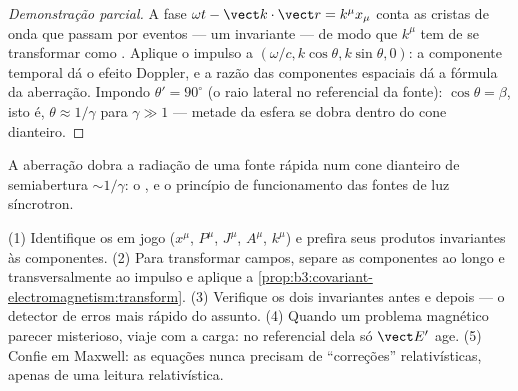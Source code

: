 \begin{proof}[Demonstração parcial]
A fase $\omega t - \vect k\cdot\vect r = k^\mu x_\mu$ conta as cristas
de onda que passam por eventos --- um invariante --- de modo que
$k^\mu$ tem de se transformar como . Aplique o impulso a
$(\omega/c, k\cos\theta,
k\sin\theta, 0)$: a componente temporal dá o efeito Doppler, e a razão
das componentes espaciais dá a fórmula da aberração. Impondo $\theta' =
90^\circ$ (o raio lateral no referencial da fonte):
$\cos\theta =
\beta$, isto é, $\theta \approx 1/\gamma$ para $\gamma \gg 1$ ---
metade da esfera se dobra dentro do cone dianteiro.
\end{proof}

\begin{omfigure}

{\small A aberração dobra a radiação de uma fonte rápida num cone
dianteiro de semiabertura $\sim 1/\gamma$: o , e o
princípio de funcionamento das fontes de luz síncrotron.}
\end{omfigure}

\begin{method}\label{met:b3:covariant-electromagnetism:method}
(1) Identifique os  em jogo ($x^\mu$, $P^\mu$, $J^\mu$,
$A^\mu$, $k^\mu$) e prefira seus produtos invariantes às componentes.
(2) Para transformar campos, separe as componentes ao longo e
transversalmente ao impulso e aplique a
\cref{prop:b3:covariant-electromagnetism:transform}. (3) Verifique os
dois invariantes antes e depois --- o detector de erros mais rápido do
assunto. (4) Quando um problema magnético parecer misterioso, viaje com
a carga: no referencial dela só $\vect E'$ age. (5) Confie em Maxwell:
as equações nunca precisam de ``correções'' relativísticas, apenas de
uma leitura relativística.
\end{method}

